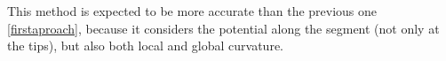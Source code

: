 \documentclass[11pt,a4paper]{article}
\begin{document}


This method is expected to be more accurate than the previous one \ref{firstaproach}, because it considers the potential along the segment (not only at the tips), but also both local and global curvature.




	
\end{document}
